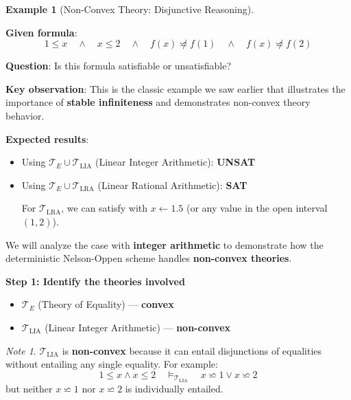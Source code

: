 \documentclass[11pt,a4paper]{article}
\theoremstyle{definition}
\newtheorem{example}{Example}[section]
\theoremstyle{plain}
\theoremstyle{remark}
\newtheorem*{remark}{Note}
\begin{document}
\begin{example}[Non-Convex Theory: Disjunctive Reasoning]
\begin{tcolorbox}[colback=purple!5!white,colframe=purple!75!black,title=\textbf{Example 3: Non-Convex $\mathcal{T}_{\text{LIA}}$ with Disjunctions},breakable]
\textbf{Given formula}:
\[
1 \leq x \quad \wedge \quad x \leq 2 \quad \wedge \quad f(x) \not\backsimeq f(1) \quad \wedge \quad f(x) \not\backsimeq f(2)
\]

\textbf{Question}: Is this formula satisfiable or unsatisfiable?

\vspace{0.5em}

\textbf{Key observation}: This is the classic example we saw earlier that illustrates the importance of \textbf{stable infiniteness} and demonstrates non-convex theory behavior.

\vspace{0.3em}

\textbf{Expected results}:
\begin{itemize}
    \item Using $\mathcal{T}_E \cup \mathcal{T}_{\text{LIA}}$ (Linear Integer Arithmetic): \textbf{UNSAT}
    \item Using $\mathcal{T}_E \cup \mathcal{T}_{\text{LRA}}$ (Linear Rational Arithmetic): \textbf{SAT}

    For $\mathcal{T}_{\text{LRA}}$, we can satisfy with $x \leftarrow 1.5$ (or any value in the open interval $(1, 2)$).
\end{itemize}

\vspace{0.5em}

We will analyze the case with \textbf{integer arithmetic} to demonstrate how the deterministic Nelson-Oppen scheme handles \textbf{non-convex theories}.

\vspace{0.5em}

\textbf{Step 1: Identify the theories involved}

\begin{itemize}
    \item $\mathcal{T}_E$ (Theory of Equality) — \textbf{convex}
    \item $\mathcal{T}_{\text{LIA}}$ (Linear Integer Arithmetic) — \textbf{non-convex}
\end{itemize}

\begin{remark}
$\mathcal{T}_{\text{LIA}}$ is \textbf{non-convex} because it can entail disjunctions of equalities without entailing any single equality. For example:
\[
1 \leq x \wedge x \leq 2 \quad \models_{\mathcal{T}_{\text{LIA}}} \quad x \backsimeq 1 \vee x \backsimeq 2
\]
but neither $x \backsimeq 1$ nor $x \backsimeq 2$ is individually entailed.
\end{remark}


\end{tcolorbox}
\end{example}
\end{document}
